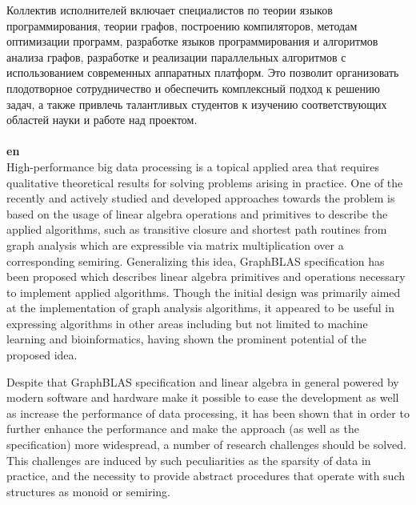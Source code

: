 \documentclass[12pt]{article}  %
\theoremstyle{remark}
\begin{document}
Коллектив исполнителей включает специалистов по теории языков программирования, теории графов, построению компиляторов, методам оптимизации программ,  разработке языков программирования и алгоритмов анализа графов, разработке и реализации параллельных алгоритмов с использованием современных аппаратных платформ. Это позволит организовать плодотворное сотрудничество и обеспечить комплексный подход к решению задач, а также привлечь талантливых студентов к изучению соответствующих областей науки и работе над проектом.
\\
\\
\textbf{en}\\

High-performance big data processing is a topical applied area that requires qualitative theoretical results for solving problems arising in practice. One of the recently and actively studied and developed approaches towards the problem is based on the usage of linear algebra operations and primitives to describe the applied algorithms, such as transitive closure and shortest path routines from graph analysis which are expressible via matrix multiplication over a corresponding semiring. Generalizing this idea, GraphBLAS specification has been proposed which describes linear algebra primitives and operations necessary to implement applied algorithms. Though the initial design was primarily aimed at the implementation of graph analysis algorithms, it appeared to be useful in expressing algorithms in other areas including but not limited to machine learning and bioinformatics, having shown the prominent potential of the proposed idea.

Despite that GraphBLAS specification and linear algebra in general powered by modern software and hardware make it possible to ease the development as well as increase the performance of data processing, it has been shown that in order to further enhance the performance and make the approach (as well as the specification) more widespread, a number of research challenges should be solved. This challenges are induced by such peculiarities as the sparsity of data in practice, and the necessity to provide abstract procedures that operate with such structures as monoid or semiring.
    
\end{document}
